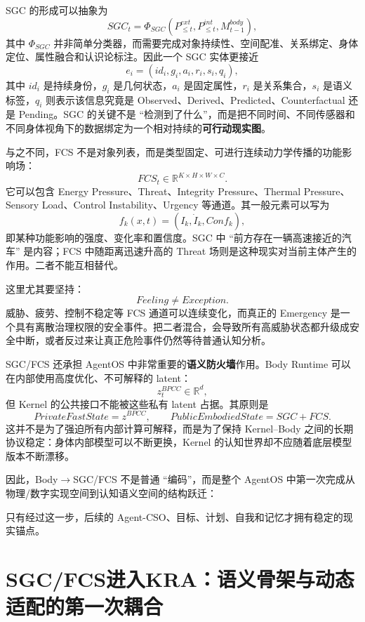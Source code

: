 SGC 的形成可以抽象为
\[
SGC_t
=
\Phi_{SGC}
\left(
P^{ext}_{\leq t},
P^{int}_{\leq t},
M^{body}_{t-1}
\right),
\]
其中 $\Phi_{SGC}$ 并非简单分类器，而需要完成对象持续性、空间配准、关系绑定、身体定位、属性融合和认识论标注。因此一个 SGC 实体更接近
\[
e_i=
\left(
id_i,
g_i,
a_i,
r_i,
s_i,
q_i
\right),
\]
其中 $id_i$ 是持续身份，$g_i$ 是几何状态，$a_i$ 是固定属性，$r_i$ 是关系集合，$s_i$ 是语义标签，$q_i$ 则表示该信息究竟是 Observed、Derived、Predicted、Counterfactual 还是 Pending。SGC 的关键不是 ``检测到了什么''，而是把不同时间、不同传感器和不同身体视角下的数据绑定为一个相对持续的\textbf{可行动现实图}。

与之不同，FCS 不是对象列表，而是类型固定、可进行连续动力学传播的功能影响场：
\[
FCS_t
\in
\mathbb R^{K\times H\times W\times C}.
\]
它可以包含 Energy Pressure、Threat、Integrity Pressure、Thermal Pressure、Sensory Load、Control Instability、Urgency 等通道。其一般元素可以写为
\[
f_{k}(x,t)
=
\left(
I_k,
\dot I_k,
Conf_k
\right),
\]
即某种功能影响的强度、变化率和置信度。SGC 中 ``前方存在一辆高速接近的汽车'' 是内容；FCS 中随距离迅速升高的 Threat 场则是这种现实对当前主体产生的作用。二者不能互相替代。

这里尤其要坚持：
\[
\boxed{
Feeling\neq Exception .
}
\]
威胁、疲劳、控制不稳定等 FCS 通道可以连续变化，而真正的 Emergency 是一个具有离散治理权限的安全事件。把二者混合，会导致所有高威胁状态都升级成安全中断，或者反过来让真正危险事件仍然等待普通认知分析。

SGC/FCS 还承担 AgentOS 中非常重要的\textbf{语义防火墙}作用。Body Runtime 可以在内部使用高度优化、不可解释的 latent：
\[
z_t^{BPCC}\in\mathbb R^d ,
\]
但 Kernel 的公共接口不能被这些私有 latent 占据。其原则是
\[
\boxed{
PrivateFastState=z^{BPCC},
\qquad
PublicEmbodiedState=SGC+FCS .
}
\]
这并不是为了强迫所有内部计算可解释，而是为了保持 Kernel--Body 之间的长期协议稳定：身体内部模型可以不断更换，Kernel 的认知世界却不应随着底层模型版本不断漂移。

因此，Body$\rightarrow$SGC/FCS 不是普通 ``编码''，而是整个 AgentOS 中第一次完成从物理/数字实现空间到认知语义空间的结构跃迁：
\begin{statementbox}
\centering
{}
\end{statementbox}
只有经过这一步，后续的 Agent-CSO、目标、计划、自我和记忆才拥有稳定的现实锚点。


\section{SGC/FCS进入KRA：语义骨架与动态适配的第一次耦合}

